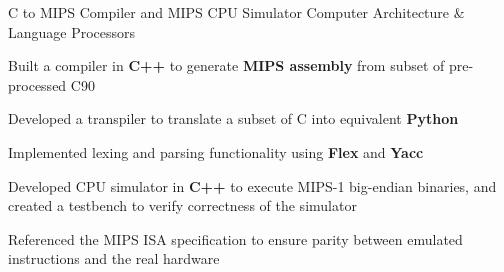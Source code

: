 \begin{cvprojects}
  \cvproject
  {C to MIPS Compiler and MIPS CPU Simulator}
  {Computer Architecture \& Language Processors}
  {
      \begin{cvitems}
          \item Built a compiler in \textbf{C++} to generate \textbf{MIPS assembly} from subset of pre-processed C90
          \item Developed a transpiler to translate a subset of C into equivalent \textbf{Python}
          \item Implemented lexing and parsing functionality using \textbf{Flex} and \textbf{Yacc}
          \item Developed CPU simulator in \textbf{C++} to execute MIPS-1 big-endian binaries, and created a testbench to verify correctness of the simulator
        \item Referenced the MIPS ISA specification to ensure parity between emulated instructions and the real hardware
    \end{cvitems}
}







\end{cvprojects}
